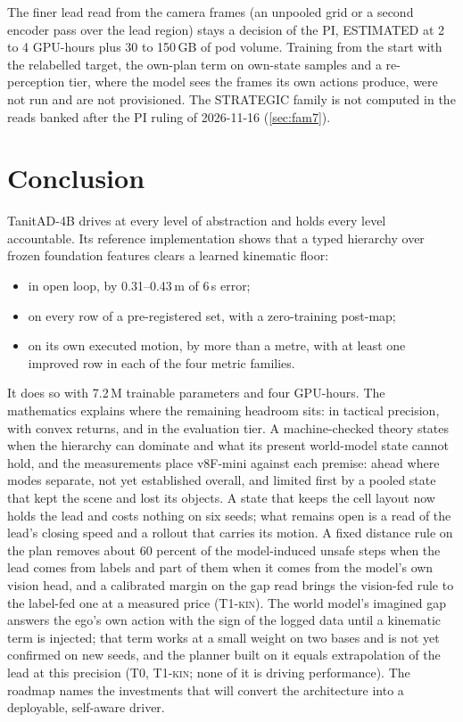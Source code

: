 \documentclass[10pt,twocolumn]{article}
\makeatletter
\theoremstyle{remark}
\newcommand{\tier}[1]{\textsc{\small #1}}
\renewcommand\paragraph{\@startsection{paragraph}{4}{\z@}{1.6ex \@plus .5ex \@minus .2ex}{-1em}{\normalfont\normalsize\bfseries}}
\makeatother
\begin{document}
\paragraph{Open decisions and gaps.} The finer lead read from the camera frames (an unpooled grid or a second encoder pass over the lead region) stays a decision of the PI, ESTIMATED at 2 to 4 GPU-hours plus 30 to 150\,GB of pod volume. Training from the start with the relabelled target, the own-plan term on own-state samples and a re-perception tier, where the model sees the frames its own actions produce, were not run and are not provisioned. The STRATEGIC family is not computed in the reads banked after the PI ruling of 2026-11-16 (\cref{sec:fam7}).

\section{Conclusion}
TanitAD-4B drives at every level of abstraction and holds every level accountable. Its reference implementation shows that a typed
hierarchy over frozen foundation features clears a learned kinematic floor:
\begin{itemize}
  \item in open loop, by 0.31--0.43\,m of 6\,s error;
  \item on every row of a pre-registered set, with a zero-training post-map;
  \item on its own executed motion, by more than a metre, with at least one improved row in each of the four metric families.
\end{itemize}
It does so with 7.2\,M trainable parameters and four GPU-hours. The mathematics explains where the remaining headroom sits: in
tactical precision, with convex returns, and in the evaluation tier. A machine-checked theory states when the hierarchy can
dominate and what its present world-model state cannot hold, and the measurements place v8F-mini against each premise: ahead
where modes separate, not yet established overall, and limited first by a pooled state that kept the scene and lost its objects.
A state that keeps the cell layout now holds the lead and costs nothing on six seeds; what remains open is a read of the lead's closing speed and a rollout that carries its motion. A fixed distance rule on the plan removes about 60 percent of the model-induced unsafe steps when the lead comes from labels and part of them when it comes from the model's own vision head, and a calibrated margin on the gap read brings the vision-fed rule to the label-fed one at a measured price (\tier{T1-kin}). The world model's imagined gap answers the ego's own action with the sign of the logged data until a kinematic term is injected; that term works at a small weight on two bases and is not yet confirmed on new seeds, and the planner built on it equals extrapolation of the lead at this precision (\tier{T0}, \tier{T1-kin}; none of it is driving performance). The roadmap names the investments that will convert the
architecture into a deployable, self-aware driver.
\end{document}
